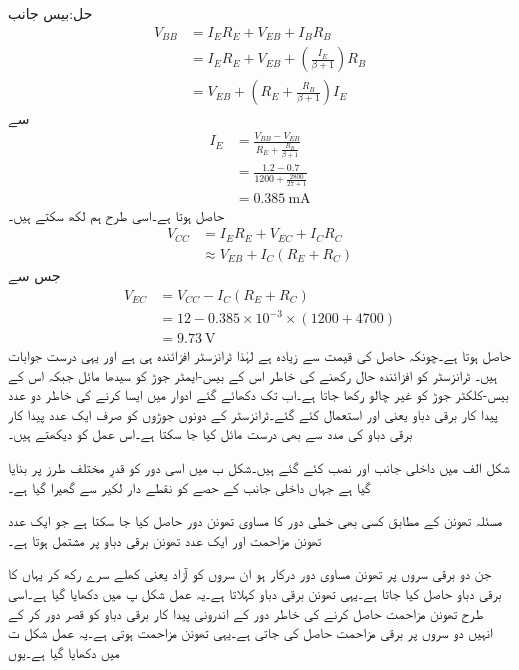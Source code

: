 حل:بیس جانب
\begin{align*}
V_{BB}&=I_E R_E+V_{EB}+I_B R_B\\
&=I_E R_E +V_{EB}+\left(\frac{I_E}{\beta+1} \right)R_B\\
&=V_{EB}+\left(R_E+\frac{R_B}{\beta+1} \right) I_E
\end{align*}
سے
\begin{align*}
I_E&=\frac{V_{BB}-V_{EB}}{R_E+\frac{R_B}{\beta+1}}\\
&=\frac{1.2-0.7}{1200+\frac{2800}{27+1}}\\
&=\SI{0.385}{\milli \ampere}
\end{align*}
حاصل ہوتا ہے۔اسی طرح ہم لکھ سکتے ہیں۔
\begin{align*}
V_{CC}&=I_E R_E +V_{EC}+I_C R_C\\
&\approx V_{EB}+I_C \left(R_E+R_C \right)
\end{align*}
جس سے
\begin{align*}
V_{EC}&=V_{CC}-I_C \left(R_E+R_C \right)\\
&=12-0.385 \times 10^{-3} \times \left(1200+4700 \right)\\
&=\SI{9.73}{\volt}
\end{align*}
حاصل ہوتا ہے۔چونکہ حاصل  کی قیمت  سے زیادہ ہے لہٰذا ٹرانزسٹر افزائندہ ہی ہے اور یہی درست جوابات ہیں۔ 
ٹرانزسٹر کو افزائندہ حال  رکھنے کی خاطر اس کے بیس-ایمٹر  جوڑ کو سیدھا مائل جبکہ اس کے بیس-کلکٹر جوڑ کو غیر چالو رکھا جاتا ہے۔اب تک دکھائے گئے ادوار میں ایسا کرنے کی خاطر دو عدد پیدا کار برقی دباو یعنی  اور   استعمال کئے گئے۔ٹرانزسٹر کے دونوں جوڑوں کو صرف ایک عدد پیدا کار برقی دباو کی مدد سے بھی درست مائل کیا جا سکتا ہے۔اس عمل کو دیکھتے ہیں۔

شکل  الف میں داخلی جانب   اور  نصب کئے گئے ہیں۔شکل  ب میں اسی دور کو قدرِ مختلف طرز پر بنایا گیا ہے جہاں داخلی جانب کے حصے کو نقطے دار لکیر سے گھیرا گیا ہے۔

مسئلہ تھونن  کے مطابق کسی بھی خطی دور کا مساوی تھونن دور حاصل کیا جا سکتا ہے جو ایک عدد تھونن مزاحمت   اور ایک عدد تھونن برقی دباو  پر مشتمل ہوتا ہے۔

جن دو برقی سروں پر تھونن مساوی دور درکار ہو ان سروں کو آزاد یعنی کھلے سرے  رکھ کر یہاں کا برقی دباو حاصل کیا جاتا ہے۔یہی تھونن برقی دباو  کہلاتا ہے۔یہ عمل شکل  پ میں دکھایا گیا ہے۔اسی طرح تھونن مزاحمت   حاصل کرنے کی خاطر دور کے اندرونی پیدا کار برقی دباو  کو قصر دور  کر کے انہیں دو سروں پر برقی مزاحمت حاصل کی جاتی ہے۔یہی تھونن مزاحمت ہوتی ہے۔یہ عمل شکل  ت میں دکھایا گیا ہے۔یوں

